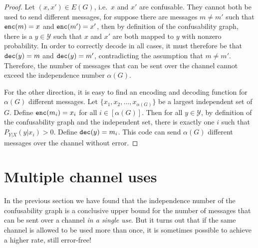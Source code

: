 \begin{proof}
Let $(x,x') \in E(G)$, i.e.\ $x$ and $x'$ are confusable. They cannot both be used to send different messages, for suppose there are messages $m \neq m'$ such that $\mathtt{enc}(m) = x$ and $\mathtt{enc}(m') = x'$, then by definition of the confusability graph, there is a $y \in \mathcal{Y}$ such that $x$ and $x'$ are both mapped to $y$ with nonzero probability. In order to correctly decode in all cases, it must therefore be that $\mathtt{dec}(y) = m$ and $\mathtt{dec}(y) = m'$, contradicting the assumption that $m \neq m'$. Therefore, the number of messages that can be sent over the channel cannot exceed the independence number $\alpha(G)$.

For the other direction, it is easy to find an encoding and decoding function for $\alpha(G)$ different messages. Let $\{x_1, x_2, \ldots, x_{\alpha(G)}\}$ be a largest independent set of $G$. Define $\mathtt{enc}(m_i) = x_i$ for all $i \in [\alpha(G)]$. Then for all $y \in \mathcal{Y}$, by definition of the confusability graph and the independent set, there is exactly one $i$ such that $P_{Y|X}(y|x_i) > 0$. Define $\mathtt{dec}(y) = m_i$. This code can send $\alpha(G)$ different messages over the channel without error.
\end{proof}


\section{Multiple channel uses}
In the previous section we have found that the independence number of the confusability graph is a conclusive upper bound for the number of messages that can be sent over a channel \emph{in a single use}. But it turns out that if the same channel is allowed to be used more than once, it is sometimes possible to achieve a higher rate, still error-free!

